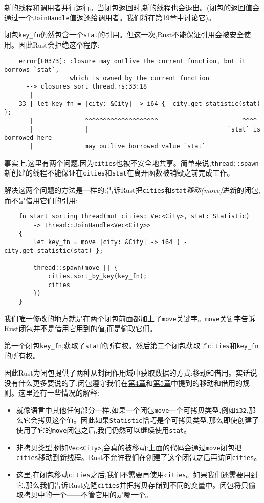 新的线程和调用者并行运行。当闭包返回时,新的线程也会退出。(闭包的返回值会通过一个\texttt{JoinHandle}值返还给调用者。我们将在\hyperref[ch19]{第19章}中讨论它)。

闭包\texttt{key\_fn}仍然包含一个\texttt{stat}的引用。但这一次,Rust不能保证引用会被安全使用。因此Rust会拒绝这个程序:
\begin{verbatim}
    error[E0373]: closure may outlive the current function, but it borrows `stat`,
                  which is owned by the current function
      --> closures_sort_thread.rs:33:18
       |
    33 | let key_fn = |city: &City| -> i64 { -city.get_statistic(stat) };
       |              ^^^^^^^^^^^^^^^^^^^^                       ^^^^
       |              |                                      `stat` is borrowed here
       |              may outlive borrowed value `stat`
\end{verbatim}

事实上,这里有两个问题,因为\texttt{cities}也被不安全地共享。简单来说,\texttt{thread::spawn}新创建的线程不能保证在\texttt{cities}和\texttt{stat}在离开函数被销毁之前完成工作。

解决这两个问题的方法是一样的:告诉Rust把\texttt{cities}和\texttt{stat}\emph{移动(move)}进新的闭包,而不是借用它们的引用:
\begin{verbatim}
    fn start_sorting_thread(mut cities: Vec<City>, stat: Statistic)
        -> thread::JoinHandle<Vec<City>>
    {
        let key_fn = move |city: &City| -> i64 { -city.get_statistic(stat) };

        thread::spawn(move || {
            cities.sort_by_key(key_fn);
            cities
        })
    }
\end{verbatim}

我们唯一修改的地方就是在两个闭包前面都加上了\texttt{move}关键字。\texttt{move}关键字告诉Rust闭包并不是借用它用到的值,而是偷取它们。

第一个闭包\texttt{key\_fn},获取了\texttt{stat}的所有权。然后第二个闭包获取了\texttt{cities}和\texttt{key\_fn}的所有权。

因此Rust为闭包提供了两种从封闭作用域中获取数据的方式:移动和借用。实话说没有什么更多要说的了,闭包遵守我们在\hyperref[ch04]{第4章}和\hyperref[ch05]{第5章}中提到的移动和借用的规则。这里还有一些情况的解释:
\begin{itemize}
    \item 就像语言中其他任何部分一样,如果一个闭包\texttt{move}一个可拷贝类型,例如\texttt{i32},那么它会拷贝这个值。因此如果\texttt{Statistic}恰巧是个可拷贝类型,那么即使创建了使用了它的\texttt{move}闭包之后,我们仍然可以继续使用\texttt{stat}。
    \item 非拷贝类型,例如\texttt{Vec<City>},会真的被移动:上面的代码会通过\texttt{move}闭包把\texttt{cities}移动到新线程。Rust不允许我们在创建了这个闭包之后再访问\texttt{cities}。
    \item 这里,在闭包移动\texttt{cities}之后,我们不需要再使用\texttt{cities}。如果我们还需要用到它,那么我们告诉Rust克隆\texttt{cities}并把拷贝存储到不同的变量中。闭包将只偷取拷贝中的一个——不管它用的是哪一个。
\end{itemize}


